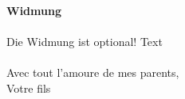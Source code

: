 





\newpage
\printindex

\newpage
{}
\textbf{\LARGE Widmung}\\\\
Die Widmung ist optional!
Text\\\\

Avec tout l'amoure de mes parents,\\ 
Votre fils



